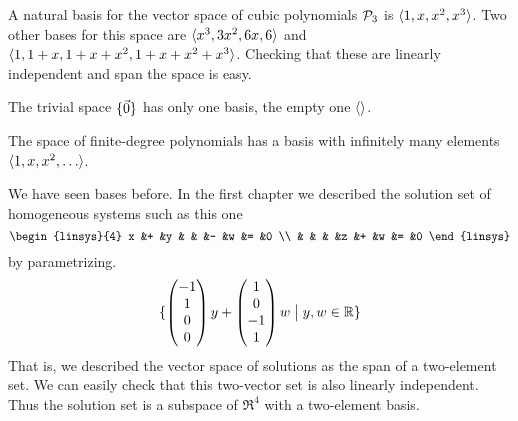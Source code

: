 \begin{example}
A natural basis for the vector space of cubic polynomials \( \mathcal{P}_3 \)
is \( \langle1,x,x^2,x^3\rangle \).
Two other bases for this space are \( \langle x^3,3x^2,6x,6\rangle \)
and \( \langle1,1+x,1+x+x^2,1+x+x^2+x^3\rangle \).
Checking that these are linearly independent and span the space is easy.
\end{example}

\begin{example}
The trivial space 
$\mbox{$\{\vec{0}\}$}$ has only one basis, the empty one
\( \langle\rangle \).
\end{example}

\begin{example}
The space of finite-degree polynomials has a basis with infinitely many
elements
\( \langle1,x,x^2,\ldots\rangle \).
\end{example}

\begin{example}
We have seen bases before.
In the first chapter we described the solution set of homogeneous systems
such as this one
\begin{equation*}
   \begin{linsys}{4}
      x  &+  &y  &   &   &-   &w   &=  &0  \\
         &   &   &   &z  &+   &w   &=  &0  
   \end{linsys}
\end{equation*}
by parametrizing.
\begin{equation*}
  \mbox{$\{\begin{pmatrix} -1 \\ 1 \\ 0 \\ 0 \end{pmatrix}y
       +\begin{pmatrix} 1 \\ 0 \\ -1 \\ 1 \end{pmatrix}w
       \bigm| y,w\in\mathbb{R} \}$}
\end{equation*}
That is, we described the vector space of solutions as 
the span of a two-element set.
We can easily check that this two-vector set is also linearly independent.
Thus the solution set is a subspace of \( \Re^4 \) with a
two-element  basis.
\end{example}

